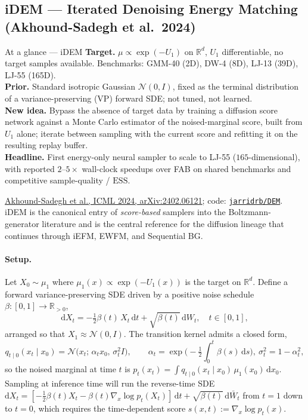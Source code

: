 \documentclass[11pt,letterpaper]{article}
\newcommand{\Real}{\mathbb{R}}
\newcommand{\ESS}{\mathrm{ESS}}
\newcommand{\dd}{\mathrm{d}}
\theoremstyle{plain}
\begin{document}
\subsection{iDEM --- Iterated Denoising Energy Matching (Akhound-Sadegh et al.\ 2024)}\label{sec:idem}

\begin{methodbox}{At a glance --- iDEM}
\textbf{Target.} $\mu\propto\exp(-U_1)$ on $\Real^d$, $U_1$ differentiable, no
target samples available. Benchmarks: GMM-40 (2D), DW-4 (8D), LJ-13 (39D),
LJ-55 (165D).\\
\textbf{Prior.} Standard isotropic Gaussian $\mathcal N(0,I)$, fixed as the
terminal distribution of a variance-preserving (VP) forward SDE; not tuned,
not learned.\\
\textbf{New idea.} Bypass the absence of target data by training a diffusion
score network against a Monte Carlo estimator of the noised-marginal score,
built from $U_1$ alone; iterate between sampling with the current score and
refitting it on the resulting replay buffer.\\
\textbf{Headline.} First energy-only neural sampler to scale to LJ-55
($165$-dimensional), with reported $2$--$5\times$ wall-clock speedups over
FAB on shared benchmarks and competitive sample-quality / $\ESS$.
\end{methodbox}

\href{https://arxiv.org/abs/2402.06121}{Akhound-Sadegh et al., ICML 2024,
arXiv:2402.06121}; code:
\href{https://github.com/jarridrb/DEM}{\texttt{jarridrb/DEM}}. iDEM is the
canonical entry of \emph{score-based} samplers into the Boltzmann-generator
literature and is the central reference for the diffusion lineage that
continues through iEFM, EWFM, and Sequential BG.

\paragraph{Setup.} Let $X_0\sim\mu_1$ where $\mu_1(x)\propto\exp(-U_1(x))$ is
the target on $\Real^d$. Define a forward variance-preserving SDE driven by a
positive noise schedule $\beta:[0,1]\to\Real_{>0}$,
\begin{equation}
  \dd X_t = -\tfrac{1}{2}\beta(t)\,X_t\,\dd t + \sqrt{\beta(t)}\,\dd W_t,\quad t\in[0,1],
  \label{eq:idem-forward}
\end{equation}
arranged so that $X_1\approx\mathcal N(0,I)$. The transition kernel admits a
closed form,
\begin{equation}
  q_{t\mid 0}(x_t\mid x_0) = \mathcal N\!\big(x_t;\,\alpha_t x_0,\,\sigma_t^2 I\big),
  \qquad \alpha_t = \exp\!\Big(\!-\tfrac{1}{2}\!\int_0^t\!\beta(s)\,\dd s\Big),\ \sigma_t^2 = 1-\alpha_t^2,
  \label{eq:idem-kernel}
\end{equation}
so the noised marginal at time $t$ is
$p_t(x_t)=\int q_{t\mid 0}(x_t\mid x_0)\,\mu_1(x_0)\,\dd x_0$. Sampling at
inference time will run the reverse-time SDE
$\dd X_t = [-\tfrac{1}{2}\beta(t)X_t - \beta(t)\nabla_x\log p_t(X_t)]\,\dd t + \sqrt{\beta(t)}\,\dd\bar W_t$
from $t=1$ down to $t=0$, which requires the time-dependent score
$s(x,t):=\nabla_x\log p_t(x)$.
\end{document}
